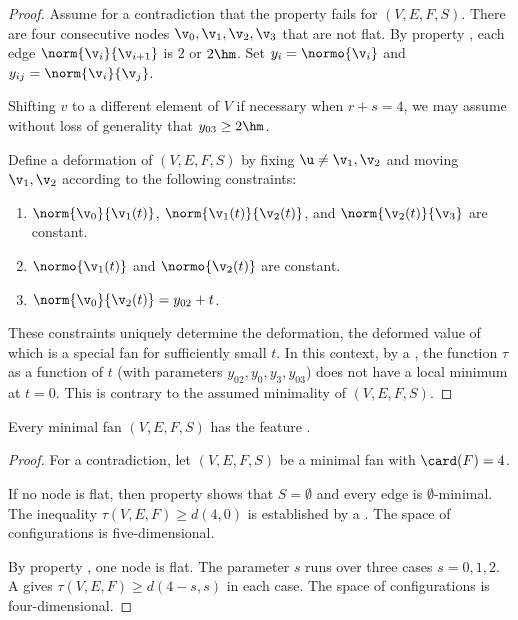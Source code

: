 \begin{proof} 
Assume for a contradiction that the property fails for $(V,E,F,S)$.
There are four
consecutive nodes $\v_0,\v_1,\v_2,\v_3$ that are not flat.  By
property , each edge $\norm{\v_i}{\v_{i+1}}$ is
$2$ or $2\hm$. Set $y_i = \normo{\v_i}$ and $y_{ij} =
\norm{\v_i}{\v_j}$.

Shifting $v$ to a different element of $V$ if necessary when
$r+s=4$, we may assume without loss of generality that $y_{03}\ge
2\hm$.

Define a deformation of $(V,E,F,S)$ by fixing $\u\ne \v_1,\v_2$ and
moving $\v_1,\v_2$ according to the following constraints:
\begin{enumerate}\wasitemize 
\item $\norm{\v_0}{\v_1(t)}$, $\norm{\v_1(t)}{\v_2(t)}$, and
$\norm{\v_2(t)}{\v_3}$ are constant.
\item $\normo{\v_1(t)}$ and $\normo{\v_2(t)}$ are constant.
\item $\norm{\v_0}{\v_2(t)} = y_{02} + t$.
\end{enumerate}\wasitemize 
These constraints uniquely determine the deformation, the  deformed
value of which is a special fan for sufficiently small $t$.  In this context,
by a , the function $\tau$ as a function of
$t$ (with parameters $y_{02},y_0,y_3,y_{03}$) does not have a local
minimum at $t=0$.  This is contrary to the assumed minimality of
$(V,E,F,S)$.
\end{proof}

\begin{lemma}[]\label{lemma:quadrilateral-free}
Every minimal fan $(V,E,F,S)$ has the feature .
\end{lemma}

\begin{proof}
For a contradiction, let $(V,E,F,S)$ be a minimal fan with $\card(F)=4$.  


If no node is flat, then property  shows that
$S=\emptyset$ and every edge is $\emptyset$-minimal.  The inequality
$\tau(V,E,F) \ge d(4,0)$ is established by
a .  The space of configurations is
five-dimensional.

By property , one node is flat.  The parameter $s$
runs over three cases $s=0,1,2$.  A 
gives $\tau(V,E,F)\ge d(4-s,s)$ in each case.  The space of
configurations is four-dimensional.
\end{proof}

